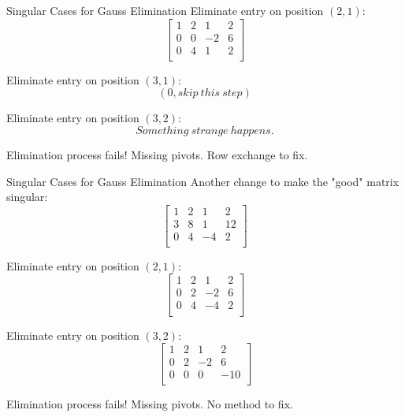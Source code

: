 \documentclass{beamer}
\begin{document}
\begin{frame}{Singular Cases for Gauss Elimination}
Eliminate entry on position $(2,1)$:
\begin{equation*}
    \left[ \begin{matrix}
        1&		2&		1&		2\\
        0&		0&		-2&		6\\
        0&		4&		1&		2\\
    \end{matrix} \right]
\end{equation*}

Eliminate entry on position $(3,1)$:
\begin{equation*}
    (0, skip \: this \: step)
\end{equation*}

Eliminate entry on position $(3,2)$:
\begin{equation*}
    Something \: strange \: happens.
\end{equation*}

Elimination process fails! Missing pivots. Row exchange to fix.

\end{frame}

\begin{frame}{Singular Cases for Gauss Elimination}
Another change to make the "good" matrix singular:
\begin{equation*}
    \left[ \begin{matrix}
        1&		2&		1&		2\\
        3&		8&		1&		12\\
        0&		4&		-4&		2\\
    \end{matrix} \right]
\end{equation*}

Eliminate entry on position $(2,1)$:
\begin{equation*}
    \left[ \begin{matrix}
        1&		2&		1&		2\\
        0&		2&		-2&		6\\
        0&		4&		-4&		2\\
    \end{matrix} \right]
\end{equation*}

Eliminate entry on position $(3,2)$:
\begin{equation*}
    \left[ \begin{matrix}
        1&		2&		1&		2\\
        0&		2&		-2&		6\\
        0&		0&		0&		-10\\
    \end{matrix} \right]
\end{equation*}

Elimination process fails! Missing pivots. No method to fix.

\end{frame}
\end{document}
